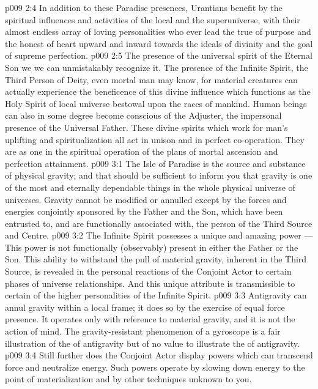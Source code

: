 \vs p009 2:4 In addition to these Paradise presences, Urantians benefit by the spiritual influences and activities of the local and the superuniverse, with their almost endless array of loving personalities who ever lead the true of purpose and the honest of heart upward and inward towards the ideals of divinity and the goal of supreme perfection.
\vs p009 2:5 The presence of the universal spirit of the Eternal Son we  we can unmistakably recognize it. The presence of the Infinite Spirit, the Third Person of Deity, even mortal man may know, for material creatures can actually experience the beneficence of this divine influence which functions as the Holy Spirit of local universe bestowal upon the races of mankind. Human beings can also in some degree become conscious of the Adjuster, the impersonal presence of the Universal Father. These divine spirits which work for man’s uplifting and spiritualization all act in unison and in perfect co\hyp{}operation. They are as one in the spiritual operation of the plans of mortal ascension and perfection attainment.
\vs p009 3:1 The Isle of Paradise is the source and substance of physical gravity; and that should be sufficient to inform you that gravity is one of the most  and eternally dependable things in the whole physical universe of universes. Gravity cannot be modified or annulled except by the forces and energies conjointly sponsored by the Father and the Son, which have been entrusted to, and are functionally associated with, the person of the Third Source and Centre.
\vs p009 3:2 \pc The Infinite Spirit possesses a unique and amazing power ---  This power is not functionally (observably) present in either the Father or the Son. This ability to withstand the pull of material gravity, inherent in the Third Source, is revealed in the personal reactions of the Conjoint Actor to certain phases of universe relationships. And this unique attribute is transmissible to certain of the higher personalities of the Infinite Spirit.
\vs p009 3:3 \pc Antigravity can annul gravity within a local frame; it does so by the exercise of equal force presence. It operates only with reference to material gravity, and it is not the action of mind. The gravity\hyp{}resistant phenomenon of a gyroscope is a fair illustration of the  of antigravity but of no value to illustrate the  of antigravity.
\vs p009 3:4 Still further does the Conjoint Actor display powers which can transcend force and neutralize energy. Such powers operate by slowing down energy to the point of materialization and by other techniques unknown to you.

